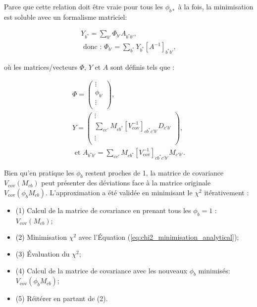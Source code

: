 Parce que cette relation doit être vraie pour tous les $\phi_{b*}$ à la fois, la minimisation est soluble avec un formalisme matriciel:

\begin{equation}
\label{eq:chi2_minimisation_analytical}
    \begin{gathered}
        Y_{b^*} = \sum_{b'} \Phi_{b'} A_{b^*b'},\\
        \textrm{ donc : } \Phi_{b'} = \sum_{b^*} Y_{b^*} \left[A^{-1}\right]_{b^*b'},
    \end{gathered}
\end{equation}

\bigbreak

où les matrices/vecteurs $\Phi$, $Y$ et $A$ sont définis tels que :

\begin{equation}
    \begin{gathered}
        \Phi = \left(\begin{matrix}
            \vdots \\
            \phi_{b'} \\
            \vdots \\
        \end{matrix} \right),\\
        Y = \left(\begin{matrix}
            \vdots \\
            \sum_{cc'} M_{cb^*} \left[V^{-1}_\textrm{cov} \right]_{cb^*c'b'} D_{c'b'} \\
            \vdots \\
        \end{matrix} \right), \\
        \textrm{ et } A_{b^*b'} =  \sum_{cc'} M_{cb^*} \left[V^{-1}_\textrm{cov} \right]_{cb^*c'b'} M_{c'b'}.
    \end{gathered}
\end{equation}

\bigbreak

Bien qu'en pratique les $\phi_b$ restent proches de 1, la matrice de covariance $V_\textrm{cov}(M_{cb})$ peut présenter des déviations face à la matrice originale $V_\textrm{cov}(\phi_bM_{cb})$. L'approximation a été validée en minimisant le $\chi^2$ itérativement :

\begin{itemize}[label=\textbullet]
    \item (1) Calcul de la matrice de covariance en prenant tous les $\phi_b = 1$ : $V_\textrm{cov}(M_{cb})$;
    \item (2) Minimisation $\chi^2$ avec l'Équation (\ref{eq:chi2_minimisation_analytical});
    \item (3) Évaluation du $\chi^2$;
    \item (4) Calcul de la matrice de covariance avec les nouveaux $\phi_b$ minimisés: $V_\textrm{cov}(\phi_bM_{cb})$;
    \item (5) Réitérer en partant de (2).
\end{itemize}

